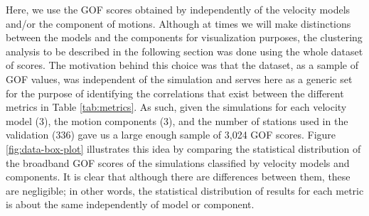 Here, we use the GOF scores obtained by \citet{Taborda_2014_BSSA} independently of the velocity models and/or the component of motions. Although at times we will make distinctions between the models and the components for visualization purposes, the clustering analysis to be described in the following section was done using the whole dataset of scores. The motivation behind this choice was that the dataset, as a sample of GOF values, was independent of the simulation and serves here as a generic set for the purpose of identifying the correlations that exist between the different metrics in Table \ref{tab:metrics}. As such, given the simulations for each velocity model (3), the motion components (3), and the number of stations used in the validation (336) gave us a large enough sample of 3,024 GOF scores. Figure \ref{fig:data-box-plot} illustrates this idea by comparing the statistical distribution of the broadband GOF scores of the simulations classified by velocity models and components. It is clear that although there are differences between them, these are negligible; in other words, the statistical distribution of results for each metric is about the same independently of model or component.

%
% 

